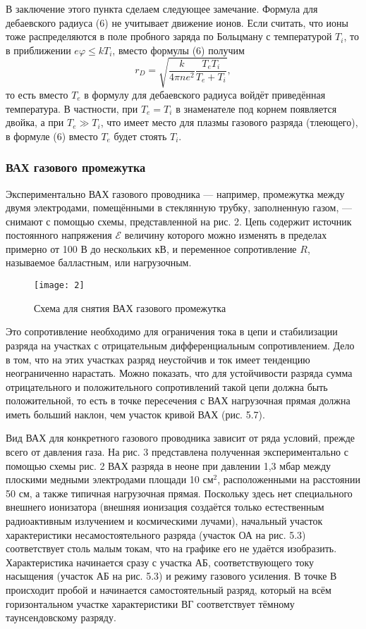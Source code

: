 В заключение этого пункта сделаем
следующее замечание. Формула для
дебаевского радиуса (6) не учитывает
движение ионов. Если считать, что ионы
тоже распределяются в поле пробного
заряда по Больцману с температурой $T_i$,
то в приближении $e\varphi \leqslant k
T_i$, вместо
формулы (6) получим
\begin{equation}
    r_D = \sqrt{\frac{k}{4\pi n
    e^2}\frac{T_e T_i}{T_e + T_i}},
\end{equation}
то есть вместо $T_e$
в формулу для дебаевского радиуса войдёт
приведённая температура. В частности,
при $T_e = T_i$ в знаменателе под корнем
появляется двойка, а при $T_e \gg T_i$, что
имеет место для плазмы газового разряда
(тлеющего), в формуле (6) вместо $T_e$ 
будет стоять $T_i$.

\subsubsection*{ВАХ газового промежутка}

Экспериментально ВАХ газового проводника
— например, промежутка между двумя
электродами, помещёнными в стеклянную
трубку, заполненную газом, — снимают с
помощью схемы, представленной на рис.
2. Цепь содержит источник постоянного
напряжения $\mathscr{E}$ величину
которого можно изменять в пределах
примерно от 100 В до нескольких кВ, и
переменное сопротивление $R$, называемое
балластным, или нагрузочным.

\begin{wrapfigure}{l}{0.4\linewidth}
    \texttt{[image: 2]}
    \captionsetup{justification=centering}
    \caption{Схема для снятия ВАХ
    газового промежутка}
\end{wrapfigure}
Это
сопротивление необходимо для ограничения
тока в цепи и стабилизации разряда на
участках с отрицательным
дифференциальным сопротивлением. Дело в
том, что на этих участках разряд
неустойчив и ток имеет тенденцию
неограниченно нарастать. Можно показать,
что для устойчивости разряда сумма
отрицательного и положительного
сопротивлений такой цепи должна быть
положительной, то есть в точке
пересечения с ВАХ нагрузочная прямая
должна иметь больший наклон, чем участок
кривой ВАХ (рис. 5.7).

Вид ВАХ для конкретного газового
проводника зависит от ряда условий,
прежде всего от давления газа. На рис.
3 представлена полученная
экспериментально с помощью схемы рис.
2 ВАХ разряда в неоне при давлении 1,3
мбар между плоскими медными электродами
площади 10 см$^2$, расположенными на
расстоянии 50 см, а также типичная
нагрузочная прямая. Поскольку здесь нет
специального внешнего ионизатора
(внешняя ионизация создаётся только
естественным радиоактивным излучением и
космическими лучами), начальный участок
характеристики несамостоятельного
разряда (участок ОА на рис. 5.3)
соответствует столь малым токам, что на
графике его не удаётся изобразить.
Характеристика начинается сразу с
участка АБ, соответствующего току
насыщения (участок АБ на рис. 5.3) и
режиму газового усиления. В точке В
происходит пробой и начинается
самостоятельный разряд, который на всём
горизонтальном участке характеристики ВГ
соответствует тёмному таунсендовскому
разряду. 

